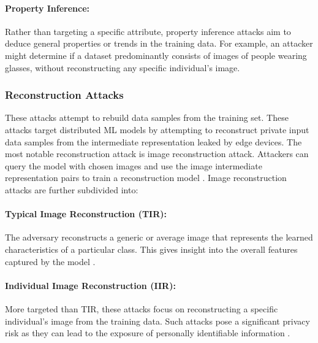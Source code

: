 \documentclass[conference]{IEEEtran}
\begin{document}

\paragraph{Property Inference:}
Rather than targeting a specific attribute, property inference attacks aim to deduce general properties or trends in the training data. For example, an attacker might determine if a dataset predominantly consists of images of people wearing glasses, without reconstructing any specific individual’s image.
\setcounter{paragraph}{0}

\subsubsection{Reconstruction Attacks}
These attacks attempt to rebuild data samples from the training set. 
These attacks target distributed ML models by attempting to reconstruct private input data samples from the intermediate representation leaked by edge devices. The most notable reconstruction attack is image reconstruction attack. Attackers can query the model with chosen images and use the image intermediate representation pairs to train a reconstruction model \cite{benkraouda2021image}. Image reconstruction attacks are further subdivided into:

\paragraph{Typical Image Reconstruction (TIR):}
The adversary reconstructs a generic or average image that represents the learned characteristics of a particular class. This gives insight into the overall features captured by the model \cite{dibbo2023sok}.

\paragraph{Individual Image Reconstruction (IIR):}
More targeted than TIR, these attacks focus on reconstructing a specific individual’s image from the training data. Such attacks pose a significant privacy risk as they can lead to the exposure of personally identifiable information \cite{dibbo2023sok}.
\setcounter{paragraph}{0}
\end{document}
